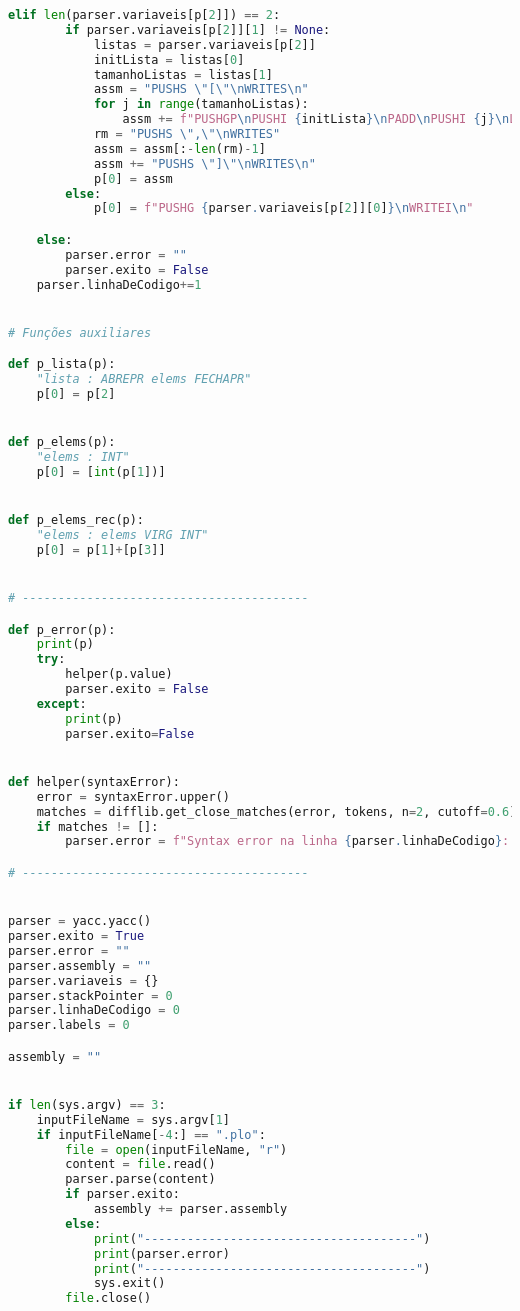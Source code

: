 \documentclass[11pt,a4paper]{report}%
\begin{document}
\begin{scriptsize}
\begin{lstlisting}[language=python]
    elif len(parser.variaveis[p[2]]) == 2:
        if parser.variaveis[p[2]][1] != None:
            listas = parser.variaveis[p[2]]
            initLista = listas[0]
            tamanhoListas = listas[1]
            assm = "PUSHS \"[\"\nWRITES\n"
            for j in range(tamanhoListas):
                assm += f"PUSHGP\nPUSHI {initLista}\nPADD\nPUSHI {j}\nLOADN\nWRITEI\nPUSHS \",\"\nWRITES\n"
            rm = "PUSHS \",\"\nWRITES"
            assm = assm[:-len(rm)-1]
            assm += "PUSHS \"]\"\nWRITES\n"
            p[0] = assm
        else:
            p[0] = f"PUSHG {parser.variaveis[p[2]][0]}\nWRITEI\n"

    else:
        parser.error = ""
        parser.exito = False
    parser.linhaDeCodigo+=1


# Funções auxiliares

def p_lista(p):
    "lista : ABREPR elems FECHAPR"
    p[0] = p[2]


def p_elems(p):
    "elems : INT"
    p[0] = [int(p[1])]


def p_elems_rec(p):
    "elems : elems VIRG INT"
    p[0] = p[1]+[p[3]]


# ----------------------------------------

def p_error(p):
    print(p)
    try:
        helper(p.value)
        parser.exito = False
    except:
        print(p)
        parser.exito=False


def helper(syntaxError):
    error = syntaxError.upper()
    matches = difflib.get_close_matches(error, tokens, n=2, cutoff=0.6)
    if matches != []:
        parser.error = f"Syntax error na linha {parser.linhaDeCodigo}: Querias dizer {matches[0]}"

# ----------------------------------------


parser = yacc.yacc()
parser.exito = True
parser.error = ""
parser.assembly = ""
parser.variaveis = {}
parser.stackPointer = 0
parser.linhaDeCodigo = 0
parser.labels = 0

assembly = ""


if len(sys.argv) == 3:
    inputFileName = sys.argv[1]
    if inputFileName[-4:] == ".plo":
        file = open(inputFileName, "r")
        content = file.read()
        parser.parse(content)
        if parser.exito:
            assembly += parser.assembly
        else:
            print("--------------------------------------")
            print(parser.error)
            print("--------------------------------------")
            sys.exit()
        file.close()


\end{lstlisting}
\end{scriptsize}
\end{document}

